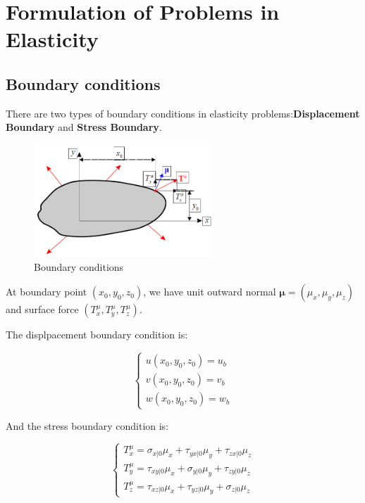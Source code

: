 \documentclass[en,hazy,cyan,8pt,normal]{elegantnote}
\numberwithin{equation}{section}
\begin{document}
\section{Formulation of Problems in Elasticity}\label{sec:04}
  \subsection{Boundary conditions}\label{subsec:04.01}

    There are two types of boundary conditions in elasticity problems:\textbf{Displacement Boundary} and \textbf{Stress Boundary}.

    \begin{figure}[H]
      \centering
      \includegraphics[width=0.6\textwidth]{image/022.png}
      \caption{Boundary conditions}
      \label{fig:022}
    \end{figure}

    At boundary point $(x_0, y_0, z_0)$, we have unit outward normal $\mathbf{\mu}=(\mu_x, \mu_y, \mu_z)$ and surface force $(T_x^{\mu}, T_y^{\mu}, T_z^{\mu})$.

    The displpacement boundary condition is:

    \begin{equation}\label{eq:075}
      \left\{
      \begin{aligned}
        u(x_0, y_0, z_0) = u_b \\
        v(x_0, y_0, z_0) = v_b \\
        w(x_0, y_0, z_0) = w_b
      \end{aligned}
      \right.
    \end{equation}

    And the stress boundary condition is:

    \begin{equation}\label{eq:076}
      \left\{
      \begin{aligned}
        T_x^{\mu} = \sigma_{x|0} \mu_x + \tau_{yx|0} \mu_y + \tau_{zx|0} \mu_z \\
        T_y^{\mu} = \tau_{xy|0} \mu_x + \sigma_{y|0} \mu_y + \tau_{zy|0} \mu_z \\
        T_z^{\mu} = \tau_{xz|0} \mu_x + \tau_{yz|0} \mu_y + \sigma_{z|0} \mu_z
      \end{aligned}
      \right.
    \end{equation}
\end{document}
